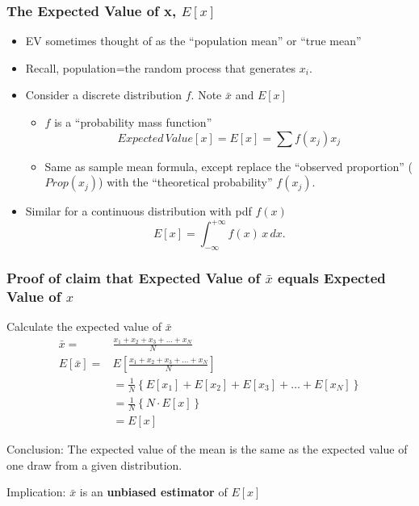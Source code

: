 \documentclass[10pt,english]{beamer}
\begin{document}
\begin{frame}
  \frametitle{The Expected Value of x, $E[x]$}

  \begin{itemize}
  \item EV sometimes thought of as the {}``population mean'' or ``true mean''
  \item  Recall, population=the random process that generates $x_{i}$.
  \item Consider a discrete distribution $f$. Note
    $\bar{x}$ and $E[x]$
    \begin{itemize}
    \item  $f$ is a {}``probability mass function''
      \begin{equation}
        Expected\, Value[x]=E[x]=\sum f(x_{j})x_{j}\label{eq:-4}\end{equation}
    \item Same as sample mean formula, except replace the {}``observed
      proportion'' ($Prop(x_{j})$) with the {}``theoretical probability'' $f(x_{j})$.
    \end{itemize}
  \item Similar for a continuous distribution with pdf $f(x)$
    \begin{equation}
      E[x] = \int_{-\infty}^{+\infty}f(x)\, x\, dx.
    \end{equation}

  \end{itemize}
\end{frame}

\begin{frame}
  \frametitle{Proof of claim that Expected Value of $\bar{x}$ equals
    Expected Value of $x$}
  Calculate the expected value of $\bar{x}$
  \begin{eqnarray*}
    \bar{x} = & \frac{x_1 + x_2 + x_3 + \ldots + x_N}{N}\\
    E[\bar{x}] = & E\left[\frac{x_1+x_2 +x_3+\ldots +x_N}{N}\right]\\
    & = \frac{1}{N} \left\{E[x_1]+E[x_2]+E[x_3]+\ldots + E[x_N] \right\}\\
    & = \frac{1}{N} \left\{N \cdot E[x] \right\} \\
    & = E[x]
  \end{eqnarray*}

   Conclusion: The expected value of the mean is the same as the
   expected value of one draw from a given distribution.

   Implication: $\bar{x}$ is an \textbf{unbiased estimator} of $E[x]$
\end{frame}
\end{document}
